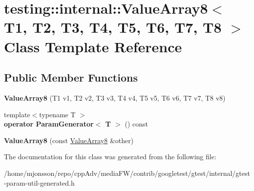 \hypertarget{classtesting_1_1internal_1_1ValueArray8}{}\section{testing\+:\+:internal\+:\+:Value\+Array8$<$ T1, T2, T3, T4, T5, T6, T7, T8 $>$ Class Template Reference}
\label{classtesting_1_1internal_1_1ValueArray8}
\subsection*{Public Member Functions}
\begin{DoxyCompactItemize}
\item 
\mbox{\label{classtesting_1_1internal_1_1ValueArray8_aa935d771149e26694277b6b9a3f6f5d3}} 
{\bfseries Value\+Array8} (T1 v1, T2 v2, T3 v3, T4 v4, T5 v5, T6 v6, T7 v7, T8 v8)
\item 
\mbox{\label{classtesting_1_1internal_1_1ValueArray8_a265f6e8bc6ceede7e673682ddebb82c5}} 
{\footnotesize template$<$typename T $>$ }\\{\bfseries operator Param\+Generator$<$ T $>$} () const
\item 
\mbox{\label{classtesting_1_1internal_1_1ValueArray8_aa2d57c811dc60c02a487c36b4b6b4464}} 
{\bfseries Value\+Array8} (const \hyperlink{classtesting_1_1internal_1_1ValueArray8}{Value\+Array8} \&other)
\end{DoxyCompactItemize}


The documentation for this class was generated from the following file\+:\begin{DoxyCompactItemize}
\item 
/home/mjonsson/repo/cpp\+Adv/media\+F\+W/contrib/googletest/gtest/internal/gtest-\/param-\/util-\/generated.\+h\end{DoxyCompactItemize}
